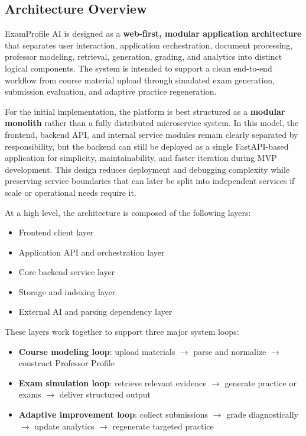 \documentclass[11pt]{article}
\begin{document}
\subsection{Architecture Overview}
ExamProfile AI is designed as a \textbf{web-first, modular application architecture} that separates user interaction, application orchestration, document processing, professor modeling, retrieval, generation, grading, and analytics into distinct logical components. The system is intended to support a clean end-to-end workflow from course material upload through simulated exam generation, submission evaluation, and adaptive practice regeneration.

For the initial implementation, the platform is best structured as a \textbf{modular monolith} rather than a fully distributed microservice system. In this model, the frontend, backend API, and internal service modules remain clearly separated by responsibility, but the backend can still be deployed as a single FastAPI-based application for simplicity, maintainability, and faster iteration during MVP development. This design reduces deployment and debugging complexity while preserving service boundaries that can later be split into independent services if scale or operational needs require it.

At a high level, the architecture is composed of the following layers:
\begin{itemize}
\item Frontend client layer
\item Application API and orchestration layer
\item Core backend service layer
\item Storage and indexing layer
\item External AI and parsing dependency layer
\end{itemize}

These layers work together to support three major system loops:
\begin{itemize}
\item \textbf{Course modeling loop}: upload materials $\rightarrow$ parse and normalize $\rightarrow$ construct Professor Profile
\item \textbf{Exam simulation loop}: retrieve relevant evidence $\rightarrow$ generate practice or exams $\rightarrow$ deliver structured output
\item \textbf{Adaptive improvement loop}: collect submissions $\rightarrow$ grade diagnostically $\rightarrow$ update analytics $\rightarrow$ regenerate targeted practice
\end{itemize}
\end{document}
